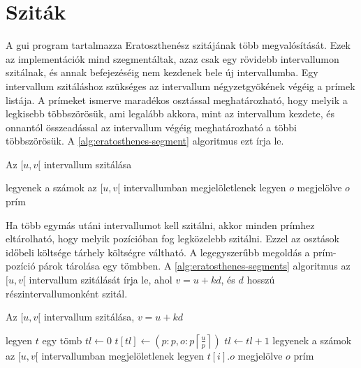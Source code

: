 \section{Sziták}

A gui program tartalmazza Eratoszthenész szitájának több megvalósítását.
Ezek az implementációk mind szegmentáltak, azaz csak egy rövidebb intervallumon szitálnak,
és annak befejezéséig nem kezdenek bele új intervallumba.
Egy intervallum szitáláshoz szükséges az intervallum négyzetgyökének végéig a prímek listája.
A prímeket ismerve maradékos osztással meghatározható, hogy melyik a legkisebb többszörösük, ami legalább akkora, mint az intervallum kezdete, és onnantól összeadással az intervallum végéig meghatározható a többi többszörösük.
A \ref{alg:eratosthenes-segment} algoritmus ezt írja le.

\begin{algorithm}
\caption{Az $[u, v[$ intervallum szitálása}
\label{alg:eratosthenes-segment}
\begin{algorithmic}[1]
\State legyenek a számok az $[u, v[$ intervallumban megjelöletlenek
		\State legyen $o$ megjelölve
	\EndFor
\EndFor
\For{$o \in [u, v[$}
		\State $o$ prím
	\EndIf
\EndFor
\end{algorithmic}
\end{algorithm}

Ha több egymás utáni intervallumot kell szitálni, akkor minden prímhez eltárolható, hogy melyik pozícióban fog legközelebb szitálni.
Ezzel az osztások időbeli költsége tárhely költségre váltható.
A legegyszerűbb megoldás a prím-pozíció párok tárolása egy tömbben.
A \ref{alg:eratosthenes-segments} algoritmus az $[u, v[$ intervallum szitálását írja le, ahol $v=u+kd$, és $d$ hosszú részintervallumonként szitál.

\begin{algorithm}
\caption{Az $[u, v[$ intervallum szitálása, $v=u+kd$}
\label{alg:eratosthenes-segments}
\begin{algorithmic}[1]
\State legyen $t$ egy tömb
\State $tl \gets 0$ 
	\State $t[tl] \gets (p: p, o: p \left \lceil{\frac{u}{p}}\right \rceil)$
	\State $tl \gets tl+1$
\EndFor
{}
	\State legyenek a számok az $[u, v[$ intervallumban megjelöletlenek
			\State legyen $t[i].o$ megjelölve
		\EndFor
	\EndFor
	\For{$o \in [u, v[$}
			\State $o$ prím
		\EndIf
	\EndFor
\EndFor
\end{algorithmic}
\end{algorithm}

